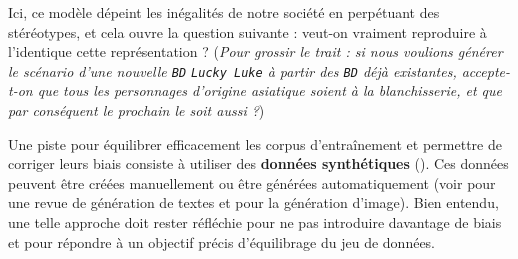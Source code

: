 \begin{leftBarExamples}
				
				Ici, ce modèle dépeint les inégalités de notre société en perpétuant des stéréotypes, et cela ouvre la question suivante : veut-on vraiment reproduire à l'identique cette représentation ?
				(\textit{Pour grossir le trait : si nous voulions générer le scénario d'une nouvelle \texttt{BD} \texttt{Lucky Luke} à partir des \texttt{BD} déjà existantes, accepte-t-on que tous les personnages d'origine asiatique soient à la blanchisserie, et que par conséquent le prochain le soit aussi ?})
			\end{leftBarExamples}
			\begin{leftBarIdea}
				Une piste pour équilibrer efficacement les corpus d'entraînement et permettre de corriger leurs biais consiste à utiliser des \textbf{données synthétiques} (\cite{jaipuria-etal:2020:deflating-dataset-bias}).
				Ces données peuvent être créées manuellement ou être générées automatiquement (voir \cite{shorten-etal:2021:text-data-augmentation} pour une revue de génération de textes et \cite{shorten-khoshgoftaar:2019:survey-image-data} pour la génération d'image).
				Bien entendu, une telle approche doit rester réfléchie pour ne pas introduire davantage de biais et pour répondre à un objectif précis d'équilibrage du jeu de données.
			\end{leftBarIdea}
			
